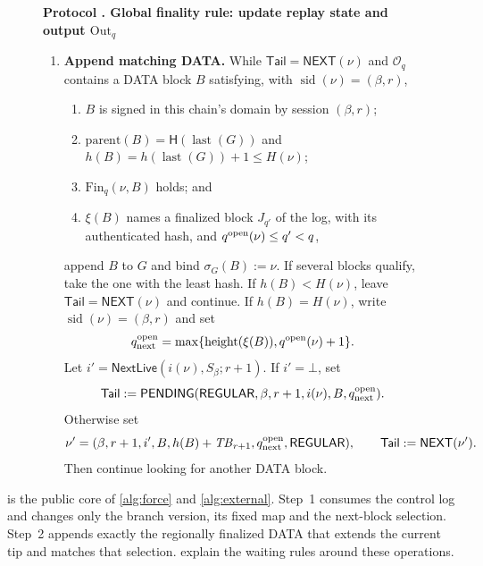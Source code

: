 \documentclass[11pt,a4paper]{article}
\newcommand{\Hash}{\mathsf H}
\newcommand{\TB}{\mathit{TB}}
\newcommand{\tagg}[1]{\ensuremath{\mathsf{#1}}}
\newcounter{protocol}
\newenvironment{protocol}[3][htbp]{\begin{figure}[#1]\refstepcounter{protocol}\label{#2}
\begin{mdframed}[linewidth=.6pt,skipabove=0pt,skipbelow=0pt,
innertopmargin=7pt,innerbottommargin=7pt]\small
\textbf{Protocol \theprotocol. #3}\par\smallskip}{\end{mdframed}\end{figure}}
\begin{document}
\begin{protocol}[H]{alg:global-rule}{Global finality rule: update replay state and output $\mathrm{Out}_q$}
\begin{enumerate}[label=\textbf{\arabic*)},itemsep=3pt]
\item \textbf{Append matching DATA.}
While $\mathsf{Tail}=\tagg{NEXT}(\nu)$ and $\mathcal O_q$ contains a
DATA block $B$ satisfying, with
$\operatorname{sid}(\nu)=(\beta,r)$,
  \begin{enumerate}[label=(\alph*),itemsep=1pt]
  \item $B$ is signed in this chain's domain by session $(\beta,r)$;
  \item $\mathrm{parent}(B)=\Hash(\operatorname{last}(G))$ and
  $h(B)=h(\operatorname{last}(G))+1\le H(\nu)$;
  \item $\mathrm{Fin}_q(\nu,B)$ holds; and
  \item $\xi(B)$ names a finalized block $J_{q'}$ of the log, with its
  authenticated hash, and $q^{\rm open}(\nu)\le q'<q$,
  \end{enumerate}
append $B$ to $G$ and bind $\sigma_G(B):=\nu$.  If several blocks
qualify, take the one with the least hash.  If $h(B)<H(\nu)$, leave
$\mathsf{Tail}=\tagg{NEXT}(\nu)$ and continue.  If $h(B)=H(\nu)$, write
$\operatorname{sid}(\nu)=(\beta,r)$ and set
\[
 q^{\rm open}_{\rm next}=
 \max\{\operatorname{height}(\xi(B)),q^{\rm open}(\nu)+1\}.
\]
Let $i'=\tagg{NextLive}(i(\nu),S_\beta;r+1)$. If $i'=\bot$, set
\[
 \mathsf{Tail}:=\tagg{PENDING}
 (\tagg{REGULAR},\beta,r+1,i(\nu),B,q^{\rm open}_{\rm next}).
\]
Otherwise set
\[
 \nu'=(\beta,r+1,i',B,h(B)+\TB_{r+1},
       q^{\rm open}_{\rm next},\tagg{REGULAR}),
 \qquad \mathsf{Tail}:=\tagg{NEXT}(\nu').
\]
Then continue looking for another DATA block.
\end{enumerate}
\end{protocol}

 is the public core of \cref{alg:force} and
\cref{alg:external}. Step~1 consumes the control log and changes only the
branch version, its fixed map and the next-block selection. Step~2
appends exactly the regionally finalized DATA that extends the current
tip and matches that selection.  explain
the waiting rules around these operations.
\end{document}
